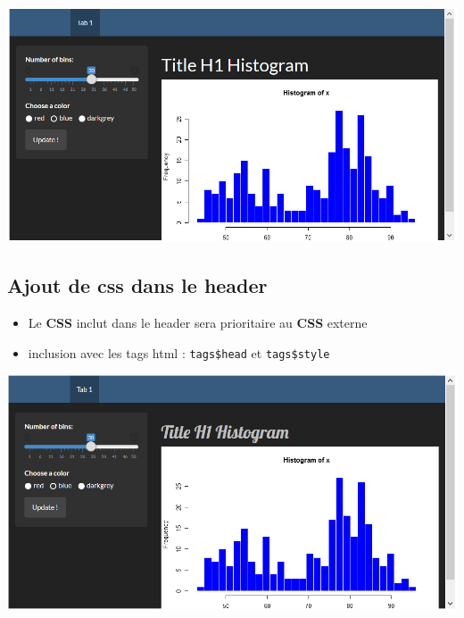 \documentclass[]{article}
\newenvironment{Shaded}{\begin{snugshade}}{\end{snugshade}}
\newcommand{\KeywordTok}[1]{\textcolor[rgb]{0.13,0.29,0.53}{\textbf{#1}}}
\newcommand{\StringTok}[1]{\textcolor[rgb]{0.31,0.60,0.02}{#1}}
\newcommand{\CommentTok}[1]{\textcolor[rgb]{0.56,0.35,0.01}{\textit{#1}}}
\newcommand{\OperatorTok}[1]{\textcolor[rgb]{0.81,0.36,0.00}{\textbf{#1}}}
\newcommand{\ErrorTok}[1]{\textcolor[rgb]{0.64,0.00,0.00}{\textbf{#1}}}
\newcommand{\NormalTok}[1]{#1}
\providecommand{\tightlist}{%
  \setlength{\itemsep}{0pt}\setlength{\parskip}{0pt}}
\begin{document}
\includegraphics{img/css1.png}

\subsection{Ajout de css dans le
header}\label{ajout-de-css-dans-le-header}

\begin{itemize}
\tightlist
\item
  Le \textbf{CSS} inclut dans le header sera prioritaire au \textbf{CSS}
  externe
\item
  inclusion avec les tags html : \texttt{tags\$head} et
  \texttt{tags\$style}
\end{itemize}

\begin{Shaded}
\end{Shaded}

\includegraphics{img/css2.png}
\end{document}
